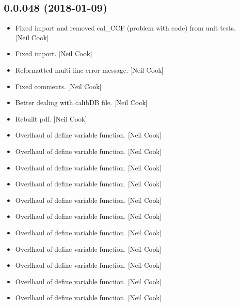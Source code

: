 \documentclass[a4paper,10pt,english]{report}
\begin{document}
\subsection{0.0.048 (2018-01-09)}
\label{\detokenize{misc/changelog:id503}}\begin{itemize}
\item {} 
Fixed import and removed cal\_CCF (problem with code) from unit tests.
{[}Neil Cook{]}

\item {} 
Fixed import. {[}Neil Cook{]}

\item {} 
Reformatted multi-line error message. {[}Neil Cook{]}

\item {} 
Fixed comments. {[}Neil Cook{]}

\item {} 
Better dealing with calibDB file. {[}Neil Cook{]}

\item {} 
Rebuilt pdf. {[}Neil Cook{]}

\item {} 
Overlhaul of define variable function. {[}Neil Cook{]}

\item {} 
Overlhaul of define variable function. {[}Neil Cook{]}

\item {} 
Overlhaul of define variable function. {[}Neil Cook{]}

\item {} 
Overlhaul of define variable function. {[}Neil Cook{]}

\item {} 
Overlhaul of define variable function. {[}Neil Cook{]}

\item {} 
Overlhaul of define variable function. {[}Neil Cook{]}

\item {} 
Overlhaul of define variable function. {[}Neil Cook{]}

\item {} 
Overlhaul of define variable function. {[}Neil Cook{]}

\item {} 
Overlhaul of define variable function. {[}Neil Cook{]}

\item {} 
Overlhaul of define variable function. {[}Neil Cook{]}

\item {} 
Overlhaul of define variable function. {[}Neil Cook{]}


\end{itemize}
\end{document}
